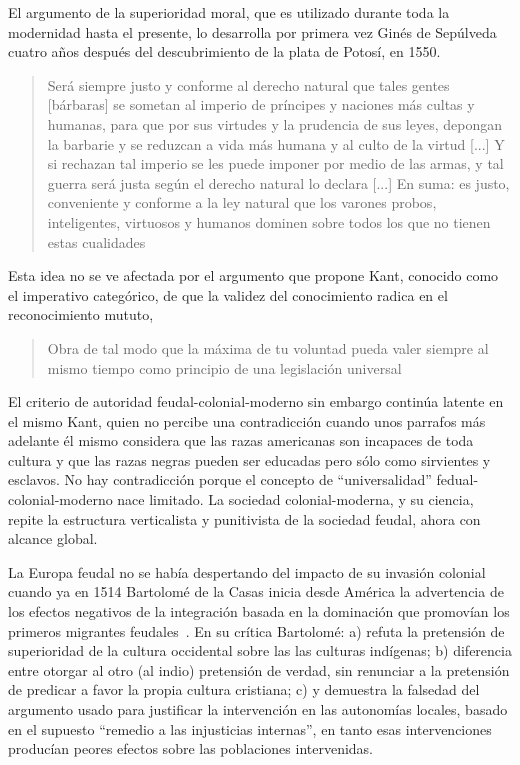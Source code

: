 \documentclass[a4paper,10pt]{book}
\theoremstyle{definition}
\begin{document}
El argumento de la superioridad moral, que es utilizado durante toda la modernidad hasta el presente, lo desarrolla por primera vez Ginés de Sepúlveda cuatro años después del descubrimiento de la plata de Potosí, en 1550.
\begin{quotation}
 Será siempre justo y conforme al derecho natural que tales gentes [bárbaras] se sometan al imperio de príncipes y naciones más cultas y humanas, para que por sus virtudes y la prudencia de sus leyes, depongan la barbarie y se reduzcan a vida más humana y al culto de la virtud [...] Y si rechazan tal imperio se les puede imponer por medio de las armas, y tal guerra será justa según el derecho natural lo declara [...] En suma: es justo, conveniente y conforme a la ley natural que los varones probos, inteligentes, virtuosos y humanos dominen sobre todos los que no tienen estas cualidades~\cite{dussel2020-primerDebate}
\end{quotation}
Esta idea no se ve afectada por el argumento que propone Kant, conocido como el imperativo categórico, de que la validez del conocimiento radica en el reconocimiento mututo,
\begin{quotation}
Obra de tal modo que la máxima de tu voluntad pueda valer siempre al mismo tiempo como principio de una legislación universal~\cite{samaja1999-epistemologiaYMetodologia}%
\end{quotation}
El criterio de autoridad feudal-colonial-moderno sin embargo continúa latente en el mismo Kant, quien no percibe una contradicción cuando unos parrafos más adelante él mismo considera que las razas americanas son incapaces de toda cultura y que las razas negras pueden ser educadas pero sólo como sirvientes y esclavos.
No hay contradicción porque el concepto de ``universalidad'' fedual-colonial-moderno nace limitado.
La sociedad colonial-moderna, y su ciencia, repite la estructura verticalista y punitivista de la sociedad feudal, ahora con alcance global.


La Europa feudal no se había despertando del impacto de su invasión colonial cuando ya en 1514 Bartolomé de la Casas inicia desde América la advertencia de los efectos negativos de la integración basada en la dominación que promovían los primeros migrantes feudales~\cite{dussel2020-primerDebate}.
En su crítica Bartolomé:
a) refuta la pretensión de superioridad de la cultura occidental sobre las las culturas indígenas;
b) diferencia entre otorgar al otro (al indio) pretensión de verdad, sin renunciar a la pretensión de predicar a favor la propia cultura cristiana;
c) y demuestra la falsedad del argumento usado para justificar la intervención en las autonomías locales, basado en el supuesto ``remedio a las injusticias internas'', en tanto esas intervenciones producían peores efectos sobre las poblaciones intervenidas.
\end{document}
